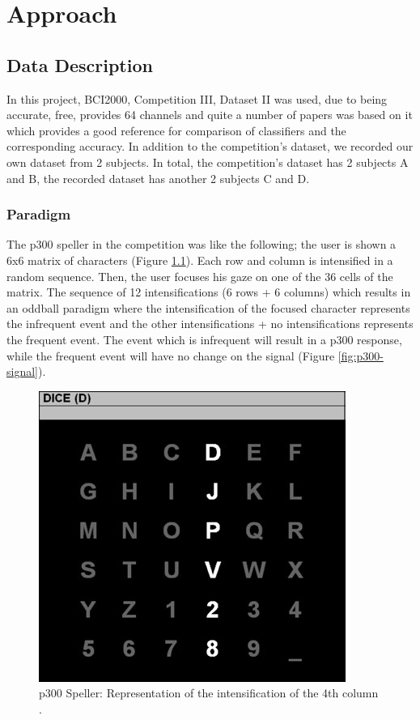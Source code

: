 \chapter{Approach}
\label{chap:approach}
\section{Data Description}
In this project, BCI2000, Competition III, Dataset II was used, due to being accurate, free, provides 64 channels and quite a number of papers was based on it which provides a good reference for comparison of classifiers and the corresponding accuracy. In addition to the competition's dataset, we recorded our own dataset from 2 subjects. In total, the competition's dataset has 2 subjects A and B, the recorded dataset has another 2 subjects C and D.\par
\subsection{Paradigm}
The \ac{p300} speller in the competition was like the following; the user is shown a 6x6 matrix of characters (Figure \ref{fig:p300-speller}). Each row and column is intensified in a random sequence. Then, the user focuses his gaze on one of the 36 cells of the matrix. The sequence of 12 intensifications (6 rows + 6 columns) which results in an oddball paradigm where the intensification of the focused character represents the infrequent event and the other intensifications + no intensifications represents the frequent event. The event which is infrequent will result in a \ac{p300} response, while the frequent event will have no change on the signal (Figure \ref{fig:p300-signal}). \cite{article1}\par
\begin{figure}
    \centering
    \includegraphics[width=\figureWidth]{images/approach/p300_speller.jpg}
    \caption{\ac{p300} Speller: Representation of the intensification of the 4th column \cite{article1}.}
    \label{fig:p300-speller}
\end{figure}
